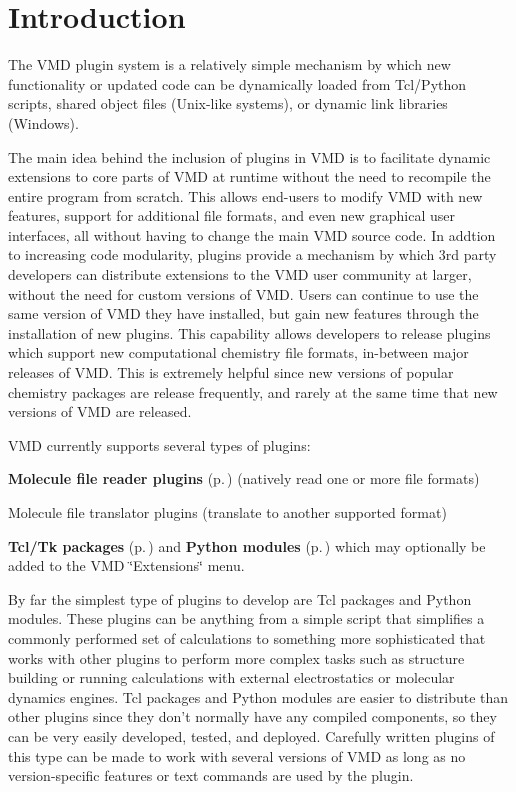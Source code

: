 \section{Introduction}\label{intro}




 The VMD plugin system is a relatively simple mechanism by which new functionality or updated code can be dynamically loaded from Tcl/Python scripts, shared object files (Unix-like systems),  or dynamic link libraries (Windows).



 The main idea behind the inclusion of plugins in VMD is to facilitate dynamic extensions to core parts of VMD at runtime without the need to recompile the entire program from scratch. This allows end-users to  modify VMD with new features, support for additional file formats,  and even new graphical user interfaces, all without having to change the main VMD source code. In addtion to increasing code modularity,  plugins provide a mechanism by which 3rd party developers can distribute extensions to the VMD user community at larger, without the need for  custom versions of VMD. Users can continue to use the same version of VMD they have installed, but gain new features through the installation of new plugins. This capability allows developers to release plugins which support new computational chemistry file formats, in-between major releases  of VMD. This is extremely helpful since new versions of popular chemistry packages are release frequently, and rarely at the same time that new  versions of VMD are released.



 VMD currently supports several types of plugins: \begin{CompactItemize}
\item 
{\bf Molecule file reader plugins} {\rm (p.\,\pageref{molfileplugins})} (natively read one or more file formats) \item 
Molecule file translator plugins (translate to another supported format) \item 
{\bf Tcl/Tk packages} {\rm (p.\,\pageref{tcltkplugins})} and  {\bf Python modules} {\rm (p.\,\pageref{pythonplugins})} which may optionally be added to  the VMD \char`\"{}Extensions\char`\"{} menu. \end{CompactItemize}


 By far the simplest type of plugins to develop are Tcl packages and Python modules. These plugins can be anything from a simple script that simplifies a commonly performed set of calculations to something more sophisticated that works with other plugins to perform more complex tasks such as structure building or running calculations with external electrostatics or molecular dynamics engines. Tcl packages and Python modules are easier to distribute than other plugins since they don't  normally have any compiled components, so they can be very easily  developed, tested, and deployed. Carefully written plugins of this type can be made to work with several versions of VMD as long as no version-specific features or text commands are used by the plugin.



